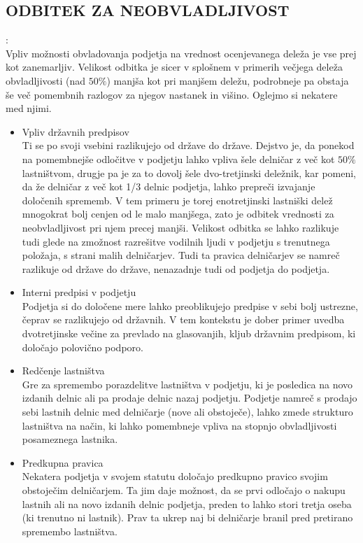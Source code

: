 \documentclass[12pt,a4paper]{amsart}
\theoremstyle{definition} %
\theoremstyle{plain} %
\begin{document}
\subsection {ODBITEK ZA NEOBVLADLJIVOST}:\\

Vpliv možnosti obvladovanja podjetja na vrednost ocenjevanega deleža je vse prej kot zanemarljiv. Velikost odbitka je sicer v splošnem v primerih večjega deleža obvladljivosti (nad $50\%$) manjša kot pri manjšem deležu, podrobneje pa obstaja še več pomembnih razlogov za njegov nastanek in višino. Oglejmo si nekatere med njimi.
\begin{itemize}
\item Vpliv državnih predpisov\\
Ti se po svoji vsebini razlikujejo od države do države. Dejstvo je, da ponekod na pomembnejše odločitve v podjetju lahko vpliva šele delničar z več kot $50\%$ lastništvom, drugje pa je za to dovolj šele dvo-tretjinski deležnik, kar pomeni, da že delničar z več kot 1/3 delnic podjetja, lahko prepreči izvajanje določenih sprememb. V tem primeru je torej enotretjinski lastniški delež mnogokrat bolj cenjen od le malo manjšega, zato je odbitek vrednosti za neobvladljivost pri njem precej manjši. Velikost odbitka se lahko razlikuje tudi glede na zmožnost razrešitve vodilnih ljudi v podjetju s trenutnega položaja, s strani malih delničarjev. Tudi ta pravica delničarjev se namreč razlikuje od države do države, nenazadnje tudi od podjetja do podjetja.
\item Interni predpisi v podjetju\\
Podjetja si do določene mere lahko preoblikujejo predpise v sebi bolj ustrezne, čeprav se razlikujejo od državnih. V tem kontekstu je dober primer uvedba dvotretjinske večine za prevlado na glasovanjih, kljub državnim predpisom, ki določajo polovično podporo. 
\item Redčenje lastništva\\
Gre za spremembo porazdelitve lastništva v podjetju, ki je posledica na novo izdanih delnic ali pa prodaje delnic nazaj podjetju. Podjetje namreč s prodajo sebi lastnih delnic med delničarje (nove ali obstoječe), lahko zmede strukturo lastništva na način, ki lahko pomembneje vpliva na stopnjo obvladljivosti posameznega lastnika. 
\item Predkupna pravica\\
Nekatera podjetja v svojem statutu določajo predkupno pravico svojim obstoječim delničarjem. Ta jim daje možnost, da se prvi odločajo o nakupu lastnih ali na novo izdanih delnic podjetja, preden to lahko stori tretja oseba (ki trenutno ni lastnik). Prav ta ukrep naj bi delničarje branil pred pretirano spremembo lastništva. 

\end{itemize}
\end{document}
